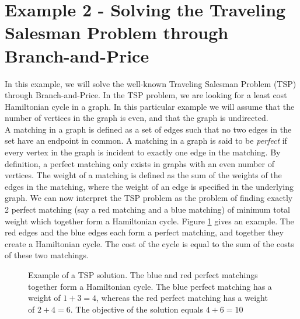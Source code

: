 \documentclass[a4paper]{article}
\begin{document}
\section{Example 2 - Solving the Traveling Salesman Problem through Branch-and-Price}\label{sec:tsp}
In this example, we will solve the well-known Traveling Salesman Problem (TSP) through Branch-and-Price. In the TSP problem, we are looking for a least cost Hamiltonian cycle in a graph. In this particular example we will assume that the number of vertices in the graph is even, and that the graph is undirected.\\
A matching in a graph is defined as a set of edges such that no two edges in the set have an endpoint in common. A matching in a graph is said to be \emph{perfect} if every vertex in the graph is incident to exactly one edge in the matching. By definition, a perfect matching only exists in graphs with an even number of vertices. The weight of a matching is defined as the sum of the weights of the edges in the matching, where the weight of an edge is specified in the underlying graph. We can now interpret the TSP problem as the problem of finding exactly 2 perfect matching (say a red matching and a blue matching) of minimum total weight which together form a Hamiltonian cycle. Figure \ref{fig:tsp_example} gives an example. The red edges and the blue edges each form a perfect matching, and together they create a Hamiltonian cycle. The cost of the cycle is equal to the sum of the costs of these two matchings.\\
\begin{figure}
\centering
{}
\caption[Example of a TSP solution.]{Example of a TSP solution. The blue and red perfect matchings together form a Hamiltonian cycle. The blue perfect matching has a weight of $1+3=4$, whereas the red perfect matching has a weight of $2+4=6$. The objective of the solution equals $4+6=10$}
\label{fig:tsp_example}
\end{figure}
\end{document}
